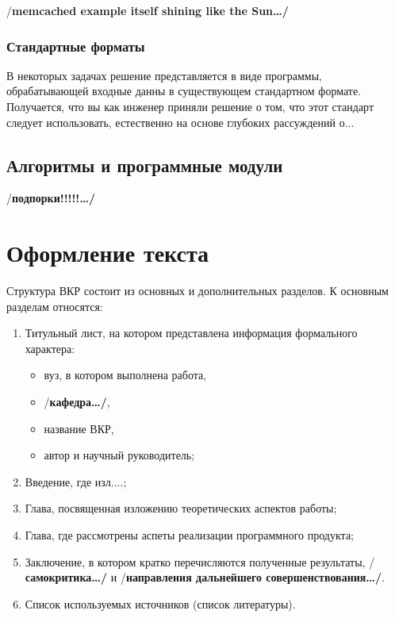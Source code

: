 \documentclass[a4paper,14pt,final]{extreport}
\newcommand{\aaa}[1]{{/\bfseries #1\ldots/}}
\begin{document}
\aaa{memcached example itself shining like the Sun}


\subsection{Стандартные форматы}
\label{sec:standardformats}

В некоторых задачах решение представляется в виде программы, обрабатывающей входные данны в существующем стандартном формате.  Получается, что вы как инженер приняли решение о том, что этот стандарт следует использовать, естественно на основе глубоких рассуждений о...

\section{Алгоритмы и программные модули}
\label{sec:programmod}



\aaa{подпорки!!!!!}

\chapter{Оформление текста}
\label{cha:layout}

Структура ВКР состоит из основных и дополнительных разделов.  К основным разделам относятся:
\begin{enumerate}
\item Титульный лист, на котором представлена информация формального характера:
  \begin{itemize}
  \item вуз, в котором выполнена работа,
  \item \aaa{кафедра},
  \item название ВКР,
  \item автор и научный руководитель;
  \end{itemize}
\item Введение, где изл....;
\item Глава, посвященная изложению теоретических аспектов работы;
\item Глава, где рассмотрены аспеты реализации программного продукта;
\item Заключение, в котором кратко перечисляются полученные результаты, \aaa{самокритика} и \aaa{направления дальнейшего совершенствования}.
\item Список используемых источников (список литературы).
\end{enumerate}
\end{document}
